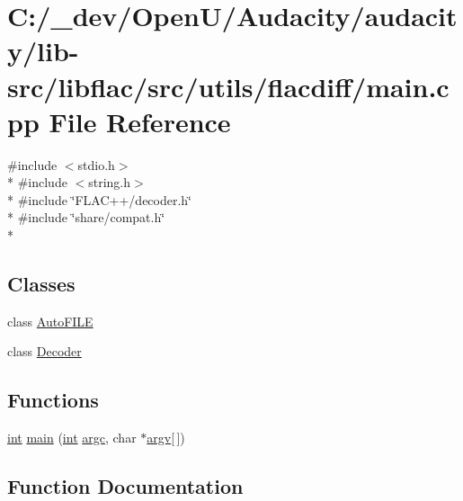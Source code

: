 \hypertarget{lib-src_2libflac_2src_2utils_2flacdiff_2main_8cpp}{}\section{C\+:/\+\_\+dev/\+Open\+U/\+Audacity/audacity/lib-\/src/libflac/src/utils/flacdiff/main.cpp File Reference}
\label{lib-src_2libflac_2src_2utils_2flacdiff_2main_8cpp}
{\ttfamily \#include $<$stdio.\+h$>$}\\*
{\ttfamily \#include $<$string.\+h$>$}\\*
{\ttfamily \#include \char`\"{}F\+L\+A\+C++/decoder.\+h\char`\"{}}\\*
{\ttfamily \#include \char`\"{}share/compat.\+h\char`\"{}}\\*
\subsection*{Classes}
\begin{DoxyCompactItemize}
\item 
class \hyperlink{class_auto_f_i_l_e}{Auto\+F\+I\+LE}
\item 
class \hyperlink{class_decoder}{Decoder}
\end{DoxyCompactItemize}
\subsection*{Functions}
\begin{DoxyCompactItemize}
\item 
\hyperlink{xmltok_8h_a5a0d4a5641ce434f1d23533f2b2e6653}{int} \hyperlink{lib-src_2libflac_2src_2utils_2flacdiff_2main_8cpp_a0ddf1224851353fc92bfbff6f499fa97}{main} (\hyperlink{xmltok_8h_a5a0d4a5641ce434f1d23533f2b2e6653}{int} \hyperlink{cmdline_8c_aaffeb1bf2056ea44af5b5d0ee4d6ff07}{argc}, char $\ast$\hyperlink{cmdline_8c_ad407d5ba91709bd9b092003858600723}{argv}\mbox{[}$\,$\mbox{]})
\end{DoxyCompactItemize}


\subsection{Function Documentation}
